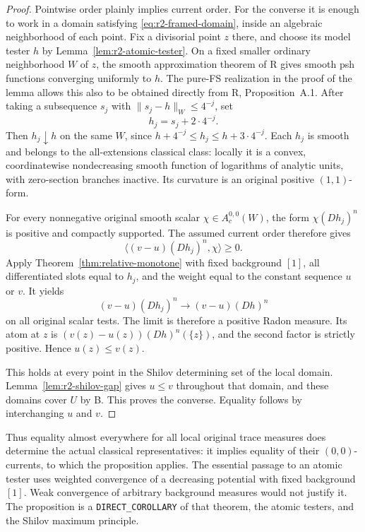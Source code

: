 \documentclass[11pt,a4paper]{article}
\numberwithin{equation}{section}
\theoremstyle{definition}
\theoremstyle{remark}
\begin{document}
\begin{proof}
Pointwise order plainly implies current order. For the converse it is
enough to work in a domain satisfying
\eqref{eq:r2-framed-domain}, inside an algebraic neighborhood of
each point. Fix a divisorial point $z$ there, and choose its model
tester $h$ by Lemma~\ref{lem:r2-atomic-tester}. On a fixed smaller
ordinary neighborhood $W$ of $z$, the smooth approximation theorem of
\textup{R} gives smooth psh functions converging uniformly to $h$.
The pure-FS realization in the proof of the lemma allows this also
to be obtained directly from \textup{R}, Proposition~A.1. After
taking a subsequence $s_j$ with
$\|s_j-h\|_W\leq4^{-j}$, set
\[
 h_j=s_j+2\cdot4^{-j}.
\]
Then $h_j\downarrow h$ on the same $W$, since
$h+4^{-j}\leq h_j\leq h+3\cdot4^{-j}$.
Each $h_j$ is smooth and belongs to the all-extensions classical
class: locally it is a convex, coordinatewise nondecreasing smooth
function of logarithms of analytic units, with zero-section branches
inactive. Its curvature is an original positive $(1,1)$-form.

For every nonnegative original smooth scalar
$\chi\in A_c^{0,0}(W)$, the form $\chi(Dh_j)^n$ is positive and
compactly supported. The assumed current order therefore gives
\[
 \big\langle (v-u)(Dh_j)^n,\chi\big\rangle\geq0.
\]
Apply Theorem~\ref{thm:relative-monotone} with fixed background
$[1]$, all differentiated slots equal to $h_j$, and the weight equal
to the constant sequence $u$ or $v$. It yields
\[
 (v-u)(Dh_j)^n\longrightarrow(v-u)(Dh)^n
\]
on all original scalar tests. The limit is therefore a positive Radon
measure. Its atom at $z$ is
$(v(z)-u(z))(Dh)^n(\{z\})$, and the second factor is strictly
positive. Hence $u(z)\leq v(z)$.

This holds at every point in the Shilov determining set of the local
domain. Lemma~\ref{lem:r2-shilov-gap} gives $u\leq v$ throughout
that domain, and these domains cover $U$ by \textup{B}. This proves
the converse. Equality follows by interchanging $u$ and $v$.
\end{proof}

Thus equality almost everywhere for all local original trace measures
does determine the actual classical representatives: it implies
equality of their $(0,0)$-currents, to which the proposition applies.
The essential passage to an atomic tester uses weighted convergence
of a decreasing potential with fixed background $[1]$. Weak
convergence of arbitrary background measures would not justify it.
The proposition is a \texttt{DIRECT\_COROLLARY} of that theorem,
the atomic testers, and the Shilov maximum principle.
\end{document}
